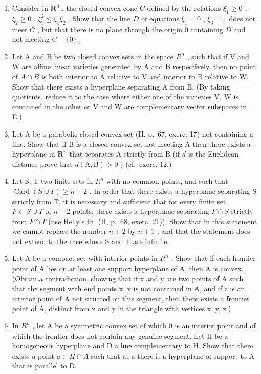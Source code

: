 \begin{enumerate}
\def\labelenumi{\arabic{enumi})}
\setcounter{enumi}{11}
\item
  Consider in \(\mathbf{R}^3\) , the closed convex cone \(C\) defined by the relations \(\xi_1 \geqslant 0\) , \(\xi_2 \geqslant 0\) , \(\xi_3^2 \leqslant \xi_1\xi_2\) . Show that the line \(D\) of equations \(\xi_1 = 0\) , \(\xi_3 = 1\) does not meet \(C\) , but that there is no plane through the origin \(0\) containing \(D\) and not meeting \(C - \{0\}\) .
\item
  Let A and B be two closed convex sets in the space \(R^{n}\) , such that if V and W are affine linear varieties generated by A and B respectively, then no point of \(A \cap B\) is both interior to A relative to V and interior to B relative to W. Show that there exists a hyperplane separating A from B. (By taking quotients, reduce it to the case where either one of the varieties V, W is contained in the other or V and W are complementary vector subspaces in E.)
\item
  Let A be a parabolic closed convex set (II, p.~67, exerc. 17) not containing a line. Show that if B is a closed convex set not meeting A then there exists a hyperplane in \(\mathbf{R}^n\) that separates A strictly from B (if \(d\) is the Euclidean distance prove that \(d(\mathrm{A},\mathrm{B}) > 0\) ) (cf.~exerc. 12.)
\item
  Let S, T two finite sets in \(R^{n}\) with no common points, and such that \(\operatorname{Card}(S \cup T) \geqslant n + 2\) . In order that there exists a hyperplane separating S strictly from T, it is necessary and sufficient that for every finite set \(F \subset S \cup T\) of \(n + 2\) points, there exists a hyperplane separating \(F \cap S\) strictly from \(F \cap T\) (use Helly's th. (II, p.~68, exerc. 21)). Show that in this statement we cannot replace the number \(n + 2\) by \(n + 1\) , and that the statement does not extend to the case where S and T are infinite.
\item
  Let A be a compact set with interior points in \(R^{n}\) . Show that if each frontier point of A lies on at least one support hyperplane of A, then A is convex. (Obtain a contradiction, showing that if x and y are two points of A such that the segment with end points x, y is not contained in A, and if z is an interior point of A not situated on this segment, then there exists a frontier point of A, distinct from x and y in the triangle with vertices x, y, z.)
\item
  In \(R^{n}\) , let A be a symmetric convex set of which 0 is an interior point and of which the frontier does not contain any genuine segment. Let H be a homogeneous hyperplane and D a line complementary to H. Show that there exists a point \(a \in H \cap A\) such that at a there is a hyperplane of support to A that is parallel to D.

\end{enumerate}

